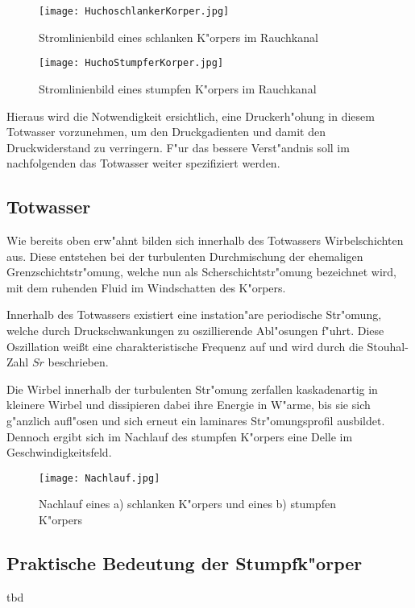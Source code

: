 \begin{figure}[h]
	\centering
	\texttt{[image: HuchoschlankerKorper.jpg]}
	\caption{Stromlinienbild eines schlanken K"orpers im Rauchkanal \cite{Hucho.2011}}
	\label{fig:HuchoSchlank}
\end{figure}

\begin{figure}[h]
	\centering
	\texttt{[image: HuchoStumpferKorper.jpg]}
	\caption{Stromlinienbild eines stumpfen K"orpers im Rauchkanal \cite{Hucho.2011}}
	\label{fig:HuchoStumpf}
\end{figure}


Hieraus wird die Notwendigkeit ersichtlich, eine Druckerh"ohung in diesem Totwasser vorzunehmen, um den Druckgadienten und damit den Druckwiderstand zu verringern. F"ur das bessere Verst"andnis soll im nachfolgenden das Totwasser weiter spezifiziert werden.

\subsection{Totwasser}
\label{sec:Totwasser}

Wie bereits oben erw"ahnt bilden sich innerhalb des Totwassers Wirbelschichten aus. Diese entstehen bei der turbulenten Durchmischung der ehemaligen Grenzschichtstr"omung, welche nun als Scherschichtstr"omung bezeichnet wird, mit dem ruhenden Fluid im Windschatten des K"orpers. 



 
Innerhalb des Totwassers existiert eine instation"are periodische Str"omung, welche durch Druckschwankungen zu oszillierende Abl"osungen f"uhrt. Diese Oszillation wei\ss{}t eine charakteristische Frequenz auf und wird durch die Stouhal-Zahl ${Sr}$ beschrieben. 

Die Wirbel innerhalb der turbulenten Str"omung  zerfallen kaskadenartig in kleinere Wirbel und dissipieren dabei ihre Energie in W"arme, bis sie sich g"anzlich aufl"osen und sich erneut ein laminares Str"omungsprofil ausbildet. Dennoch ergibt sich im Nachlauf des stumpfen K"orpers eine Delle im Geschwindigkeitsfeld. 

\begin{figure}[h]
	\centering
	\texttt{[image: Nachlauf.jpg]}
	\caption{Nachlauf eines a) schlanken K"orpers und eines b) stumpfen K"orpers \cite{Hucho.2011}}
	\label{fig:Nachlauf}
\end{figure}

\subsection{Praktische Bedeutung der Stumpfk"orper}
tbd


